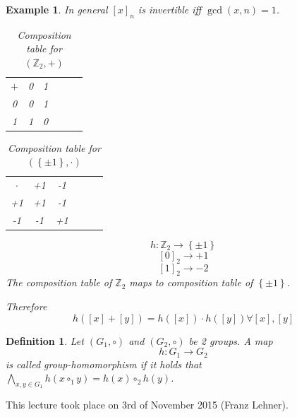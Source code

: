 \documentclass[a4paper,landscape,twocolumn]{article}
\newcommand\meta[3]{This #1 took place on #2 (#3).\par}
\newcommand\set[1]{\left\{#1\right\}}
\newtheorem{defi}{Definition}
\newtheorem{ex}{Example}
\begin{document}
\begin{ex}
  In general $[x]_n$ is invertible iff $\gcd{(x, n)} = 1$.

  \begin{table}[!ht]
    \begin{center}
      \begin{tabular}{c|ccccc}
        $+$ & 0 & 1 \\
          0 & 0 & 1 \\
          1 & 1 & 0
      \end{tabular}
      \caption{Composition table for $(\mathbb{Z}_2, +)$}
    \end{center}
  \end{table}
  \begin{table}[!ht]
    \begin{center}
      \begin{tabular}{c|ccccc}
        $\cdot$ & +1 & -1 \\
             +1 & +1 & -1 \\
             -1 & -1 & +1
      \end{tabular}
      \caption{Composition table for $(\set{\pm 1}, \cdot)$}
    \end{center}
  \end{table}

  \[ h: \mathbb{Z}_2 \rightarrow \set{\pm 1} \]
  \[ [0]_2 \rightarrow +1 \]
  \[ [1]_2 \rightarrow -2 \]
  The composition table of $\mathbb{Z}_2$ maps to composition table of $\set{\pm 1}$.

  Therefore
  \[ h([x] + [y]) = h([x]) \cdot h([y]) \forall [x], [y] \]
\end{ex}

\begin{defi}
  Let $(G_1, \circ)$ and $(G_2, \circ)$ be 2 groups. A map
  \[ h: G_1 \rightarrow G_2 \]
  is called group-homomorphism if it holds that
  $\bigwedge_{x,y \in G_1} h(x \circ_1 y) = h(x) \circ_2 h(y)$.
\end{defi}

\meta{lecture}{3rd of November 2015}{Franz Lehner}
\end{document}
